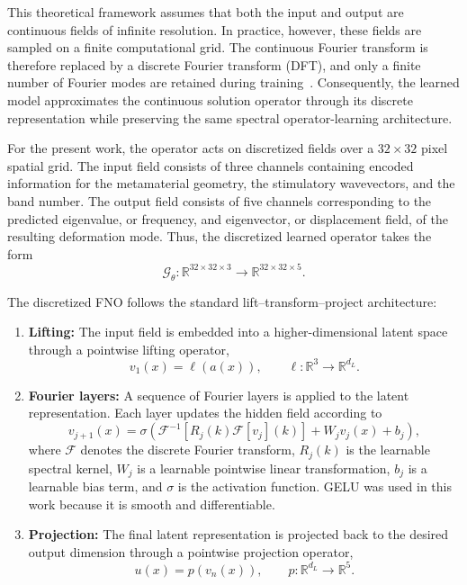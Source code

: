 \documentclass[preprint,review,12pt,numafflabel]{elsarticle}
\begin{document}
This theoretical framework assumes that both the input and output are continuous fields of infinite resolution. In practice, however, these fields are sampled on a finite computational grid. The continuous Fourier transform is therefore replaced by a discrete Fourier transform (DFT), and only a finite number of Fourier modes are retained during training~\cite{li2021fno,qin2024spectralfno}. Consequently, the learned model approximates the continuous solution operator through its discrete representation while preserving the same spectral operator-learning architecture.

For the present work, the operator acts on discretized fields over a $32\times32$ pixel spatial grid. The input field consists of three channels containing encoded information for the metamaterial geometry, the stimulatory wavevectors, and the band number. The output field consists of five channels corresponding to the predicted eigenvalue, or frequency, and eigenvector, or displacement field, of the resulting deformation mode. Thus, the discretized learned operator takes the form
\begin{equation}
\mathcal{G}_{\theta}:
\mathbb{R}^{32\times32\times3}
\rightarrow
\mathbb{R}^{32\times32\times5}.
\end{equation}

The discretized FNO follows the standard lift--transform--project architecture:
\begin{enumerate}
\item \textbf{Lifting:} The input field is embedded into a higher-dimensional latent space through a pointwise lifting operator,
\begin{equation}
v_1(x)=\ell(a(x)),
\qquad
\ell:\mathbb{R}^{3}\rightarrow\mathbb{R}^{d_L}.
\end{equation}

\item \textbf{Fourier layers:} A sequence of Fourier layers is applied to the latent representation. Each layer updates the hidden field according to
\begin{equation}
v_{j+1}(x)
=
\sigma\left(
\mathcal{F}^{-1}
\left[
R_j(k)\mathcal{F}[v_j](k)
\right]
+
W_jv_j(x)
+
b_j
\right),
\end{equation}
where $\mathcal{F}$ denotes the discrete Fourier transform, $R_j(k)$ is the learnable spectral kernel, $W_j$ is a learnable pointwise linear transformation, $b_j$ is a learnable bias term, and $\sigma$ is the activation function. GELU was used in this work because it is smooth and differentiable.

\item \textbf{Projection:} The final latent representation is projected back to the desired output dimension through a pointwise projection operator,
\begin{equation}
u(x)=p(v_n(x)),
\qquad
p:\mathbb{R}^{d_L}\rightarrow\mathbb{R}^{5}.
\end{equation}
\end{enumerate}
\end{document}
